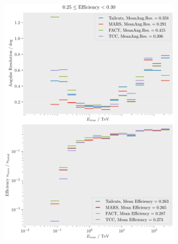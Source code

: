 \begin{figure}
    \centering
    \begin{subfigure}{0.45\textwidth}
        \centering
        \includegraphics[width=\textwidth]{plots/ar_aeff/AR_Aeff_MST_0.25_0.30.pdf}
    \end{subfigure}
    \hfill
    \begin{subfigure}{0.45\textwidth}
        \centering

\end{subfigure}
\end{figure}
